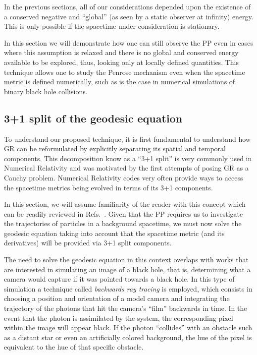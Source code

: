 In the previous sections, all of our considerations depended upon the existence of a conserved negative and ``global'' (as seen by a static observer at infinity) energy. This is only possible if the spacetime under consideration is stationary. 

In this section we will demonstrate how one can still observe the \ac{PP} even in cases where this assumption is relaxed and there is no global and conserved energy available to be explored, thus, looking only at locally defined quantities. This technique allows one to study the Penrose mechanism even when the spacetime metric is defined numerically, such as is the case in numerical simulations of binary black hole collisions.

\subsection{3+1 split of the geodesic equation}

To understand our proposed technique, it is first fundamental to understand how \ac{GR} can be reformulated by explicitly separating its spatial and temporal components. This decomposition know as a ``3+1 split'' is very commonly used in Numerical Relativity and was motivated by the first attempts of posing \ac{GR} as a Cauchy problem. Numerical Relativity codes very often provide ways to access the spacetime metrics being evolved in terms of its 3+1 components.

In this section, we will assume familiarity of the reader with this concept which can be readily reviewed in Refs.~\cite{Alcubierre2012-xp, 9780521514071, 9781108928250}. Given that the \ac{PP} requires us to investigate the trajectories of particles in a background spacetime, we must now solve the geodesic equation taking into account that the spacetime metric (and its derivatives) will be provided via 3+1 split components. 

The need to solve the geodesic equation in this context overlaps with works that are interested in simulating an image of a black hole, that is, determining what a camera would capture if it was pointed towards a black hole. In this type of simulation a technique called \emph{backwards ray tracing} is employed, which consists in choosing a position and orientation of a model camera and integrating the trajectory of the photons that hit the camera's ``film'' backwards in time. In the event that the photon is assimilated by the system, the corresponding pixel within the image will appear black. If the photon ``collides'' with an obstacle such as a distant star or even an artificially colored background, the hue of the pixel is equivalent to the hue of that specific obstacle.


